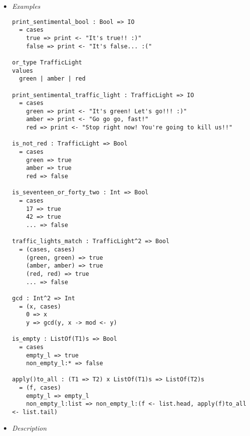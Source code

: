 \documentclass{article}
\begin{document}
\begin{itemize}
\item \textit{Examples}

\begin{verbatim}
print_sentimental_bool : Bool => IO
  = cases
    true => print <- "It's true!! :)"
    false => print <- "It's false... :("

or_type TrafficLight
values
  green | amber | red

print_sentimental_traffic_light : TrafficLight => IO
  = cases
    green => print <- "It's green! Let's go!!! :)"
    amber => print <- "Go go go, fast!"
    red => print <- "Stop right now! You're going to kill us!!"

is_not_red : TrafficLight => Bool
  = cases
    green => true
    amber => true
    red => false

is_seventeen_or_forty_two : Int => Bool
  = cases
    17 => true
    42 => true
    ... => false

traffic_lights_match : TrafficLight^2 => Bool
  = (cases, cases)
    (green, green) => true
    (amber, amber) => true
    (red, red) => true
    ... => false

gcd : Int^2 => Int
  = (x, cases)
    0 => x
    y => gcd(y, x -> mod <- y) 

is_empty : ListOf(T1)s => Bool
  = cases
    empty_l => true
    non_empty_l:* => false

apply()to_all : (T1 => T2) x ListOf(T1)s => ListOf(T2)s
  = (f, cases)
    empty_l => empty_l
    non_empty_l:list => non_empty_l:(f <- list.head, apply(f)to_all <- list.tail)

\end{verbatim}

\item \textit{Description}


\end{itemize}
\end{document}
